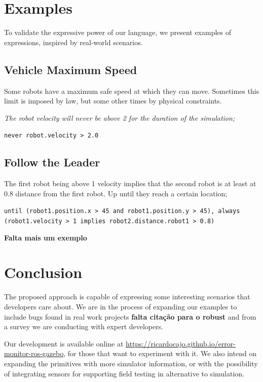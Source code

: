 \documentclass[runningheads]{llncs}
\begin{document}
\section{Examples}

To validate the expressive power of our language, we present examples of expressions, inspired by real-world scenarios.


\subsection{Vehicle Maximum Speed}

Some robots have a maximum safe speed at which they can move. Sometimes this limit is imposed by law, but some other times by physical constraints.


\textit{The robot velocity will never be above 2 for the duration of the simulation;}

\vspace{3mm}

\texttt{never robot.velocity > 2.0}

\subsection{Follow the Leader}

The first robot being above 1 velocity implies that the second robot is at least at 0.8 distance from the first robot. Up until they reach a certain location;

\vspace{3mm}

\texttt{until (robot1.position.x > 45 and robot1.position.y > 45), always (robot1.velocity > 1 implies robot2.distance.robot1 > 0.8)}


\textbf{Falta mais um exemplo}

\section{Conclusion}

The proposed approach is capable of expressing some interesting scenarios that developers care about. We are in the process of expanding our examples to include bugs found in real work projects \textbf{falta citação para o robust} and from a survey we are conducting with expert developers.

Our development is available online at \url{https://ricardocajo.github.io/error-monitor-ros-gazebo}, for those that want to experiment with it. We also intend on expanding the primitives with more simulator information, or with the possibility of integrating sensors for supporting field testing in alternative to simulation.
\end{document}
